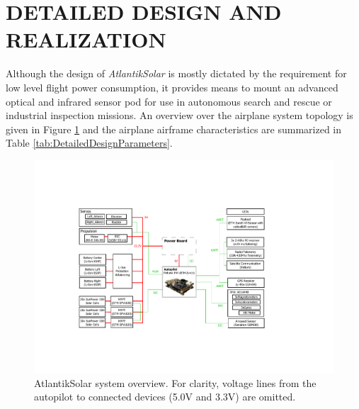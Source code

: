 \section{DETAILED DESIGN AND REALIZATION}\label{sec:detailed_design}

Although the design of \textit{AtlantikSolar} is mostly dictated by the requirement for low level flight power consumption, it provides means to mount an advanced optical and infrared sensor pod for use in autonomous search and rescue or industrial inspection missions. An overview over the airplane system topology is given in Figure \ref{fig:AtlantikSolar_SystemOverview} and the airplane airframe characteristics are summarized in Table \ref{tab:DetailedDesignParameters}.

\begin{figure}[t]
    \centering
     \includegraphics[width=\linewidth]{images/8_AtlantikSolar_Avionics}
    \caption{AtlantikSolar system overview. For clarity, voltage lines from the autopilot to connected devices (5.0V and 3.3V) are omitted.}
    \label{fig:AtlantikSolar_SystemOverview}
\end{figure}


